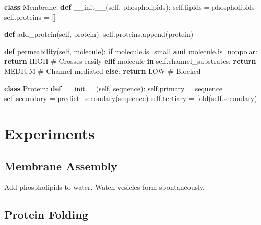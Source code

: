\documentclass[
  11pt,
  letterpaper,
  twoside,
  openright]{book}
\newenvironment{Shaded}{\begin{snugshade}}{\end{snugshade}}
\newcommand{\CommentTok}[1]{\textcolor[rgb]{0.37,0.37,0.37}{#1}}
\newcommand{\ControlFlowTok}[1]{\textcolor[rgb]{0.00,0.23,0.31}{\textbf{#1}}}
\newcommand{\FunctionTok}[1]{\textcolor[rgb]{0.28,0.35,0.67}{#1}}
\newcommand{\KeywordTok}[1]{\textcolor[rgb]{0.00,0.23,0.31}{\textbf{#1}}}
\newcommand{\NormalTok}[1]{\textcolor[rgb]{0.00,0.23,0.31}{#1}}
\newcommand{\OperatorTok}[1]{\textcolor[rgb]{0.37,0.37,0.37}{#1}}
\newcommand{\VariableTok}[1]{\textcolor[rgb]{0.07,0.07,0.07}{#1}}
\begin{document}
\begin{Shaded}
\begin{Highlighting}[]
\KeywordTok{class}\NormalTok{ Membrane:}
    \KeywordTok{def} \FunctionTok{\_\_init\_\_}\NormalTok{(}\VariableTok{self}\NormalTok{, phospholipids):}
        \VariableTok{self}\NormalTok{.lipids }\OperatorTok{=}\NormalTok{ phospholipids}
        \VariableTok{self}\NormalTok{.proteins }\OperatorTok{=}\NormalTok{ []}

    \KeywordTok{def}\NormalTok{ add\_protein(}\VariableTok{self}\NormalTok{, protein):}
        \VariableTok{self}\NormalTok{.proteins.append(protein)}

    \KeywordTok{def}\NormalTok{ permeability(}\VariableTok{self}\NormalTok{, molecule):}
        \ControlFlowTok{if}\NormalTok{ molecule.is\_small }\KeywordTok{and}\NormalTok{ molecule.is\_nonpolar:}
            \ControlFlowTok{return}\NormalTok{ HIGH  }\CommentTok{\# Crosses easily}
        \ControlFlowTok{elif}\NormalTok{ molecule }\KeywordTok{in} \VariableTok{self}\NormalTok{.channel\_substrates:}
            \ControlFlowTok{return}\NormalTok{ MEDIUM  }\CommentTok{\# Channel{-}mediated}
        \ControlFlowTok{else}\NormalTok{:}
            \ControlFlowTok{return}\NormalTok{ LOW  }\CommentTok{\# Blocked}

\KeywordTok{class}\NormalTok{ Protein:}
    \KeywordTok{def} \FunctionTok{\_\_init\_\_}\NormalTok{(}\VariableTok{self}\NormalTok{, sequence):}
        \VariableTok{self}\NormalTok{.primary }\OperatorTok{=}\NormalTok{ sequence}
        \VariableTok{self}\NormalTok{.secondary }\OperatorTok{=}\NormalTok{ predict\_secondary(sequence)}
        \VariableTok{self}\NormalTok{.tertiary }\OperatorTok{=}\NormalTok{ fold(}\VariableTok{self}\NormalTok{.secondary)}
\end{Highlighting}
\end{Shaded}

\section{Experiments}\label{experiments-14}

\subsection{Membrane Assembly}\label{membrane-assembly}

Add phospholipids to water. Watch vesicles form spontaneously.

\subsection{Protein Folding}\label{protein-folding-1}
\end{document}
